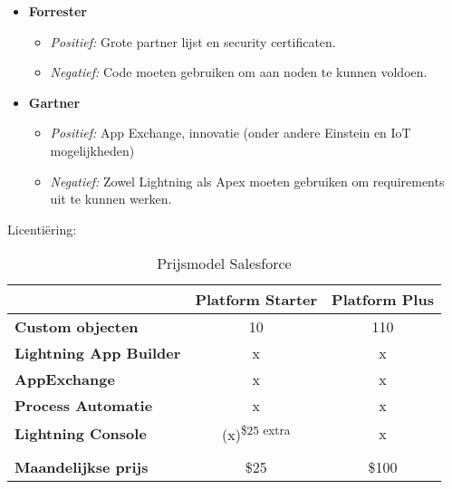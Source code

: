 \begin{itemize}
    \item \textbf{Forrester}
    \begin{itemize}
        \item \textit{Positief:} Grote partner lijst en security certificaten.
        \item \textit{Negatief:} Code moeten gebruiken om aan noden te kunnen voldoen.
    \end{itemize}
    \item \textbf{Gartner}
    \begin{itemize}
        \item \textit{Positief:} App Exchange, innovatie (onder andere Einstein en IoT mogelijkheden)
        \item \textit{Negatief:} Zowel Lightning als Apex moeten gebruiken om requirements uit te kunnen werken.
    \end{itemize}
\end{itemize}

Licentiëring:
\begin{table}[h!]
    \centering
    \begin{tabular}{|l|c|c|}
        \hline
        \textbf{}                      & \multicolumn{1}{l|}{\textbf{Platform Starter}} & \multicolumn{1}{l|}{\textbf{Platform Plus}} \\ \hline
        \textbf{Custom objecten}       & 10                                             & 110                                         \\ \hline
        \textbf{Lightning App Builder} & x                                              & x                                           \\ \hline
        \textbf{AppExchange}           & x                                              & x                                           \\ \hline
        \textbf{Process Automatie}     & x                                              & x                                           \\ \hline
        \textbf{Lightning Console}      & (x)\textsuperscript{\$25 extra}                                            & x                                           \\ \hline
        \textbf{}                      &                                                &                                             \\ \hline
        \textbf{Maandelijkse prijs}    & \$25                                           & \$100                                       \\ \hline
    \end{tabular}
    \caption{Prijsmodel Salesforce \autocite{Salesforcea}}
    \label{tab:plan-salesforce}
\end{table}

